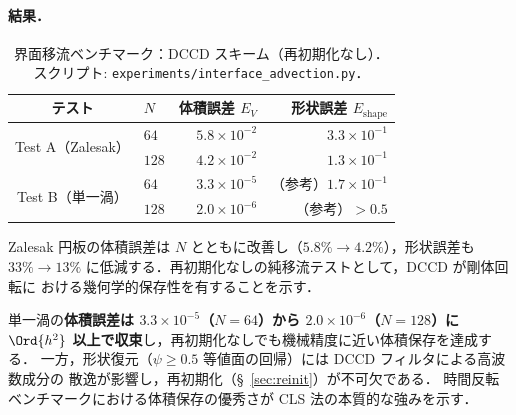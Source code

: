 \paragraph{結果．}

\begin{table}[htbp]
\centering
\caption{界面移流ベンチマーク：DCCD スキーム（再初期化なし）．
  スクリプト: \texttt{experiments/interface\_advection.py}．}
\label{tab:interface_advection}
\begin{tabular}{c l r r}
\toprule
テスト & $N$ & 体積誤差 $E_V$ & 形状誤差 $E_\text{shape}$ \\
\midrule
\multirow{2}{*}{Test A（Zalesak）}
  & $64$  & $5.8\times10^{-2}$ & $3.3\times10^{-1}$ \\
  & $128$ & $4.2\times10^{-2}$ & $1.3\times10^{-1}$ \\
\midrule
\multirow{2}{*}{Test B（単一渦）}
  & $64$  & $3.3\times10^{-5}$ & （参考）$1.7\times10^{-1}$ \\
  & $128$ & $2.0\times10^{-6}$ & （参考）$> 0.5$ \\
\bottomrule
\end{tabular}
\end{table}

\begin{tcolorbox}[resultbox, title={Test A 結果：Zalesak スロット円板}]
Zalesak 円板の体積誤差は $N$ とともに改善し（$5.8\% \to 4.2\%$），形状誤差も
$33\% \to 13\%$ に低減する．再初期化なしの純移流テストとして，DCCD が剛体回転に
おける幾何学的保存性を有することを示す．
\end{tcolorbox}

\begin{tcolorbox}[resultbox, title={Test B 結果：単一渦（体積保存）}]
単一渦の\textbf{体積誤差は $3.3\times10^{-5}$（$N=64$）から $2.0\times10^{-6}$（$N=128$）に
$\Ord{h^2}$ 以上で収束}し，再初期化なしでも機械精度に近い体積保存を達成する．
一方，形状復元（$\psi\geq 0.5$ 等値面の回帰）には DCCD フィルタによる高波数成分の
散逸が影響し，再初期化（§~\ref{sec:reinit}）が不可欠である．
時間反転ベンチマークにおける体積保存の優秀さが CLS 法の本質的な強みを示す．
\end{tcolorbox}

